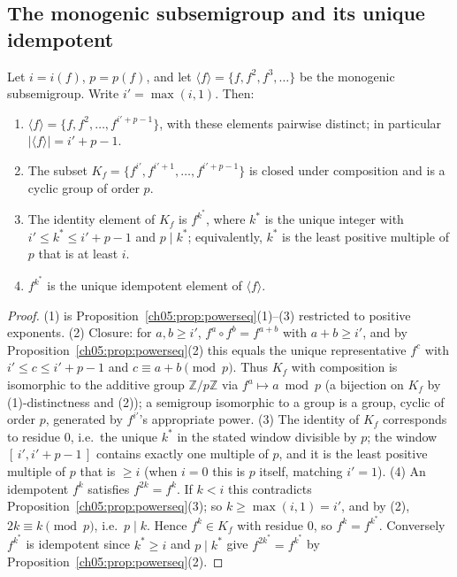 \subsection{The monogenic subsemigroup and its unique idempotent}

\begin{proposition}
\label{ch05:prop:monogenic}
Let $i = i(f)$, $p = p(f)$, and let
$\langle f \rangle = \{ f, f^{2}, f^{3}, \dots \}$ be the monogenic
subsemigroup. Write $i' = \max(i, 1)$. Then:
\begin{enumerate}
\item $\langle f \rangle = \{ f, f^{2}, \dots, f^{i' + p - 1} \}$, with
these elements pairwise distinct; in particular
$|\langle f \rangle| = i' + p - 1$.
\item The subset $K_f = \{ f^{i'}, f^{i' + 1}, \dots, f^{i' + p - 1} \}$ is
closed under composition and is a cyclic group of order $p$.
\item The identity element of $K_f$ is $f^{k^{*}}$, where $k^{*}$ is the
unique integer with $i' \le k^{*} \le i' + p - 1$ and
$p \mid k^{*}$; equivalently, $k^{*}$ is the least positive multiple of $p$
that is at least $i$.
\item $f^{k^{*}}$ is the unique idempotent element of $\langle f \rangle$.
\end{enumerate}
\end{proposition}

\begin{proof}
(1) is Proposition~\ref{ch05:prop:powerseq}(1)--(3) restricted to positive
exponents. (2) Closure: for $a, b \ge i'$, $f^{a} \circ f^{b} = f^{a+b}$
with $a + b \ge i'$, and by
Proposition~\ref{ch05:prop:powerseq}(2) this equals the unique
representative $f^{c}$ with $i' \le c \le i' + p - 1$ and
$c \equiv a + b \pmod p$. Thus $K_f$ with composition is isomorphic to the
additive group $\mathbb{Z}/p\mathbb{Z}$ via $f^{a} \mapsto a \bmod p$
(a bijection on $K_f$ by (1)-distinctness and (2)); a semigroup isomorphic
to a group is a group, cyclic of order $p$, generated by $f^{i'}$'s
appropriate power. (3) The identity of $K_f$ corresponds to residue $0$,
i.e.\ the unique $k^{*}$ in the stated window divisible by $p$; the window
$[\,i', i' + p - 1\,]$ contains exactly one multiple of $p$, and it is the
least positive multiple of $p$ that is $\ge i$ (when $i = 0$ this is $p$
itself, matching $i' = 1$). (4) An idempotent $f^{k}$ satisfies
$f^{2k} = f^{k}$. If $k < i$ this contradicts
Proposition~\ref{ch05:prop:powerseq}(3); so $k \ge \max(i,1) = i'$, and by
(2), $2k \equiv k \pmod p$, i.e.\ $p \mid k$. Hence $f^{k} \in K_f$ with
residue $0$, so $f^{k} = f^{k^{*}}$. Conversely $f^{k^{*}}$ is idempotent
since $k^{*} \ge i$ and $p \mid k^{*}$ give
$f^{2k^{*}} = f^{k^{*}}$ by Proposition~\ref{ch05:prop:powerseq}(2).
\end{proof}

